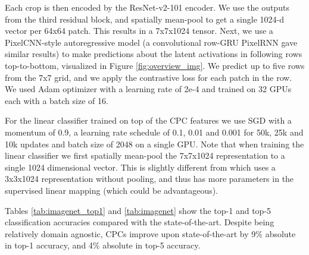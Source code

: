 Each crop is then encoded by the ResNet-v2-101 encoder. We use the outputs from the third residual block, and spatially mean-pool to get a single 1024-d vector per 64x64 patch. This results in a 7x7x1024 tensor. Next, we use a PixelCNN-style autoregressive model \cite{aaron2016pixelcnn} (a convolutional row-GRU PixelRNN \cite{aaron2016pixelrnn} gave similar results) to make predictions about the latent activations in following rows top-to-bottom, visualized in Figure \ref{fig:overview_img}. We predict up to five rows from the 7x7 grid, and we apply the contrastive loss for each patch in the row. We used Adam optimizer with a learning rate of 2e-4 and trained on 32 GPUs each with a batch size of 16.

For the linear classifier trained on top of the CPC features we use SGD with a momentum of 0.9, a learning rate schedule of 0.1, 0.01 and 0.001 for 50k, 25k and 10k updates and batch size of 2048 on a single GPU. Note that when training the linear classifier we first spatially mean-pool the 7x7x1024 representation to a single 1024 dimensional vector. This is slightly different from \cite{doersch2017multi} which uses a 3x3x1024 representation without pooling, and thus has more parameters in the supervised linear mapping (which could be advantageous).

Tables \ref{tab:imagenet_top1} and \ref{tab:imagenet} show the top-1 and top-5 classification accuracies compared with the state-of-the-art. Despite being relatively domain agnostic, CPCs improve upon state-of-the-art by 9\% absolute in top-1 accuracy, and 4\% absolute in top-5 accuracy.

